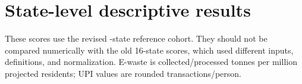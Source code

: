 \documentclass[11pt,a4paper]{article}
\begin{document}
\clearpage
\appendix
\section{State-level descriptive results}\label{app:data}
These scores use the revised \SampleN{}-state reference cohort. They should not be compared numerically with the old 16-state scores, which used different inputs, definitions, and normalization. E-waste is collected/processed tonnes per million projected residents; UPI values are rounded transactions/person.

\end{document}
